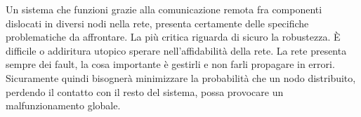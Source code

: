 Un sistema che funzioni grazie alla comunicazione remota fra componenti dislocati in diversi nodi nella rete, presenta certamente delle
specifiche problematiche da affrontare. La pi\`{u} critica riguarda di sicuro la robustezza. \`{E} difficile o addiritura utopico sperare
nell'affidabilit\`{a} della rete. La rete presenta sempre dei fault, la cosa importante \`{e} gestirli e non farli propagare in errori. Sicuramente
quindi bisogner\`{a} minimizzare la probabilit\`{a} che un nodo distribuito, perdendo il contatto con il resto del sistema, possa provocare un 
malfunzionamento globale.